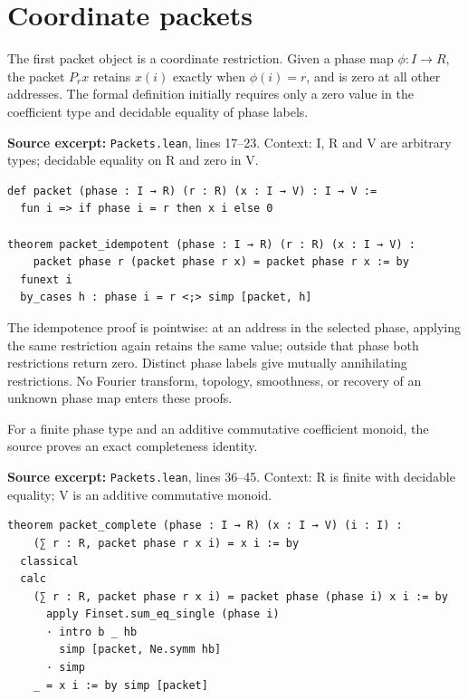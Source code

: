 \documentclass[11pt]{article}
\begin{document}
\hypertarget{coordinate-packets}{%
\section{Coordinate packets}\label{coordinate-packets}}

The first packet object is a coordinate restriction. Given a phase map \(\phi:I\to R\), the packet \(P_r x\) retains \(x(i)\) exactly when \(\phi(i)=r\), and is zero at all other addresses. The formal definition initially requires only a zero value in the coefficient type and decidable equality of phase labels.

\textbf{Source excerpt:} \texttt{Packets.lean}, lines 17--23. Context: I, R and V are arbitrary types; decidable equality on R and zero in V.

\begin{minipage}{\linewidth}
\begin{lstlisting}
def packet (phase : I → R) (r : R) (x : I → V) : I → V :=
  fun i => if phase i = r then x i else 0

theorem packet_idempotent (phase : I → R) (r : R) (x : I → V) :
    packet phase r (packet phase r x) = packet phase r x := by
  funext i
  by_cases h : phase i = r <;> simp [packet, h]
\end{lstlisting}
\end{minipage}\par

The idempotence proof is pointwise: at an address in the selected phase, applying the same restriction again retains the same value; outside that phase both restrictions return zero. Distinct phase labels give mutually annihilating restrictions. No Fourier transform, topology, smoothness, or recovery of an unknown phase map enters these proofs.

For a finite phase type and an additive commutative coefficient monoid, the source proves an exact completeness identity.

\textbf{Source excerpt:} \texttt{Packets.lean}, lines 36--45. Context: R is finite with decidable equality; V is an additive commutative monoid.

\begin{minipage}{\linewidth}
\begin{lstlisting}
theorem packet_complete (phase : I → R) (x : I → V) (i : I) :
    (∑ r : R, packet phase r x i) = x i := by
  classical
  calc
    (∑ r : R, packet phase r x i) = packet phase (phase i) x i := by
      apply Finset.sum_eq_single (phase i)
      · intro b _ hb
        simp [packet, Ne.symm hb]
      · simp
    _ = x i := by simp [packet]
\end{lstlisting}
\end{minipage}\par
\end{document}
